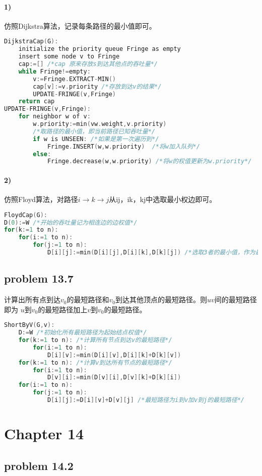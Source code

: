 \documentclass[11pt,a4paper,oneside,oldfontcommands]{ctexart}
\begin{document}
\paragraph*{1)}仿照Dijkstra算法，记录每条路径的最小值即可。
\begin{lstlisting}[language=C++,title=DijkstraCap.func]
DijkstraCap(G):
	initialize the priority queue Fringe as empty
	insert some node v to Fringe
	cap:=[] /*cap 原来存放s到达其他点的吞吐量*/
	while Fringe!=empty:
		v:=Fringe.EXTRACT-MIN()
		cap[v]:=v.priority /*存放到达v的结果*/
		UPDATE-FRINGE(v,Fringe)
	return cap
UPDATE-FRINGE(v,Fringe):
	for neighbor w of v:
		w.priority:=min(vw.weight,v.priority) 
		/*取路径的最小值，即当前路径已知吞吐量*/
		if w is UNSEEN: /*如果是第一次遍历到*/
			Fringe.INSERT(w,w.priority)  /*将w加入队列*/
		else:
			Fringe.decrease(w,w.priority) /*将w的权值更新为w.priority*/
\end{lstlisting}
\paragraph*{2)}仿照Floyd算法，对路径$i \rightarrow k \rightarrow j$从ij，ik，kj中选取最小权边即可。
\begin{lstlisting}[language=C++,title=FloydCap.func]
FloydCap(G):
D(0):=W /*开始的吞吐量记为相连边的边权值*/
for(k:=1 to n):
	for(i:=1 to n):
		for(j:=1 to n):
			D[i][j]:=min(D[i][j],D[i][k],D[k][j]) /*选取3者的最小值，作为最大吞吐量*/
\end{lstlisting}
\newpage
{\subsection*{problem 13.7}}
计算出所有点到达$v_0$的最短路径和$v_0$到达其他顶点的最短路径。则$uv$间的最短路径即为
$u$到$v_0$的最短路径加上$v$到$v_0$的最短路径。
\begin{lstlisting}[language=C++,title=ShortByV.func]
ShortByV(G,v):
	D:=W /*初始化所有最短路径为起始结点权值*/
	for(k:=1 to n): /*计算所有节点到达v的最短路径*/
		for(i:=1 to n):
			D[i][v]:=min(D[i][v],D[i][k]+D[k][v])
	for(k:=1 to n): /*计算v到达所有节点的最短路径*/
		for(i:=1 to n):
			D[v][i]:=min(D[v][i],D[v][k]+D[k][i])
	for(i:=1 to n):
		for(j:=1 to n):
			D[i][j]:=D[i][v]+D[v][j] /*最短路径为i到v加v到j的最短路径*/
\end{lstlisting}
\section*{Chapter 14}
\hypertarget{14.2}{\subsection*{problem 14.2}}
\end{document}
